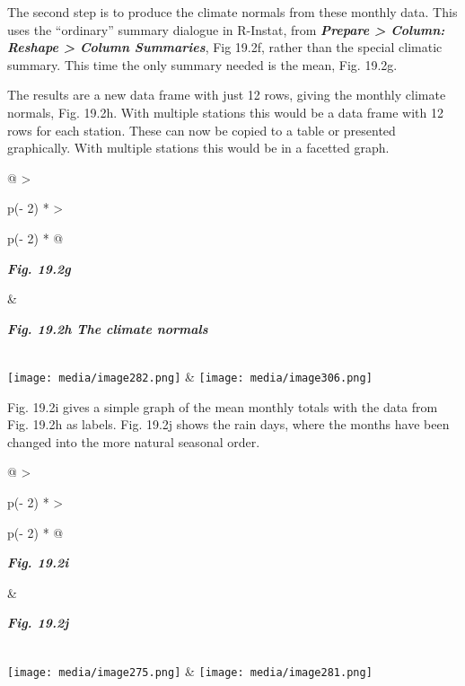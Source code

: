 \documentclass[
  letterpaper,
  DIV=11,
  numbers=noendperiod]{scrreprt}
\begin{document}
The second step is to produce the climate normals from these monthly
data. This uses the ``ordinary'' summary dialogue in R-Instat, from
\textbf{\emph{Prepare \textgreater{} Column: Reshape \textgreater{}
Column Summaries}}, Fig 19.2f, rather than the special climatic summary.
This time the only summary needed is the mean, Fig. 19.2g.

The results are a new data frame with just 12 rows, giving the monthly
climate normals, Fig. 19.2h. With multiple stations this would be a data
frame with 12 rows for each station. These can now be copied to a table
or presented graphically. With multiple stations this would be in a
facetted graph.

\begin{longtable}[]{@{}
  >{\raggedright\arraybackslash}p{(\columnwidth - 2\tabcolsep) * }
  >{\raggedright\arraybackslash}p{(\columnwidth - 2\tabcolsep) * }@{}}
\toprule\noalign{}
\begin{minipage}[b]{\linewidth}\raggedright
\textbf{\emph{Fig. 19.2g}}
\end{minipage} & \begin{minipage}[b]{\linewidth}\raggedright
\textbf{\emph{Fig. 19.2h The climate normals}}
\end{minipage} \\
\midrule\noalign{}
\endhead
\bottomrule\noalign{}
\endlastfoot
\texttt{[image: media/image282.png]} &
\texttt{[image: media/image306.png]} \\
\end{longtable}

Fig. 19.2i gives a simple graph of the mean monthly totals with the data
from Fig. 19.2h as labels. Fig. 19.2j shows the rain days, where the
months have been changed into the more natural seasonal order.

\begin{longtable}[]{@{}
  >{\raggedright\arraybackslash}p{(\columnwidth - 2\tabcolsep) * }
  >{\raggedright\arraybackslash}p{(\columnwidth - 2\tabcolsep) * }@{}}
\toprule\noalign{}
\begin{minipage}[b]{\linewidth}\raggedright
\textbf{\emph{Fig. 19.2i}}
\end{minipage} & \begin{minipage}[b]{\linewidth}\raggedright
\textbf{\emph{Fig. 19.2j}}
\end{minipage} \\
\midrule\noalign{}
\endhead
\bottomrule\noalign{}
\endlastfoot
\texttt{[image: media/image275.png]} &
\texttt{[image: media/image281.png]} \\
\end{longtable}
\end{document}
